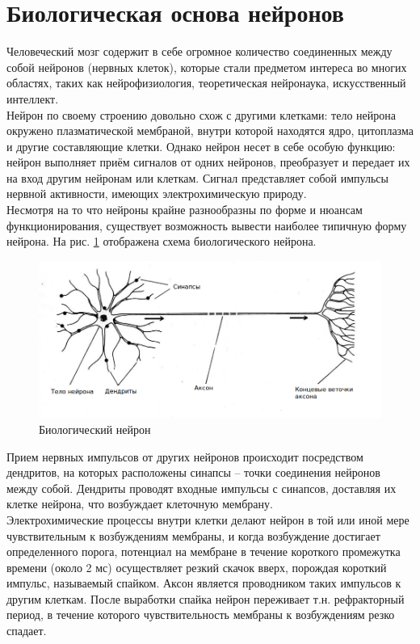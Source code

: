 \documentclass[a4paper,10pt]{article}
\begin{document}
\section{Биологическая основа нейронов}
\indent Человеческий мозг содержит в себе огромное количество соединенных между собой нейронов (нервных клеток), которые стали предметом интереса во многих областях, таких как нейрофизиология, теоретическая нейронаука, искусственный интеллект.\\
\indent Нейрон по своему строению довольно схож с другими клетками: тело нейрона окружено плазматической мембраной, внутри которой находятся ядро, цитоплазма и другие составляющие клетки. Однако нейрон несет в себе особую функцию: нейрон выполняет приём сигналов от одних нейронов, преобразует и передает их на вход другим нейронам или клеткам. Сигнал представляет собой импульсы нервной активности, имеющих электрохимическую природу.\\
\indent Несмотря на то что нейроны крайне разнообразны по форме и нюансам функционирования, существует возможность вывести наиболее типичную форму нейрона. На рис. \ref{bio_pic} отображена схема биологического нейрона. \\
\begin{figure}[ht]
\centering
\includegraphics[width=1\linewidth]{bio_neuron.png}
\caption{Биологический нейрон}
\label{bio_pic}
\end{figure}
\FloatBarrier
\indent Прием нервных импульсов от других нейронов происходит посредством дендритов, на которых расположены синапсы -- точки соединения нейронов между собой. Дендриты проводят входные импульсы с синапсов, доставляя их клетке нейрона, что возбуждает клеточную мембрану.\\
\indent Электрохимические процессы внутри клетки делают нейрон в той или иной мере чувствительным к возбуждениям мембраны, и когда возбуждение достигает определенного порога, потенциал на мембране в течение короткого промежутка времени (около 2 мс) осуществляет резкий скачок вверх, порождая короткий импульс, называемый спайком. Аксон является проводником таких импульсов к другим клеткам. После выработки спайка нейрон переживает т.н. рефракторный период, в течение которого чувствительность мембраны к возбуждениям резко спадает.\\
\end{document}
